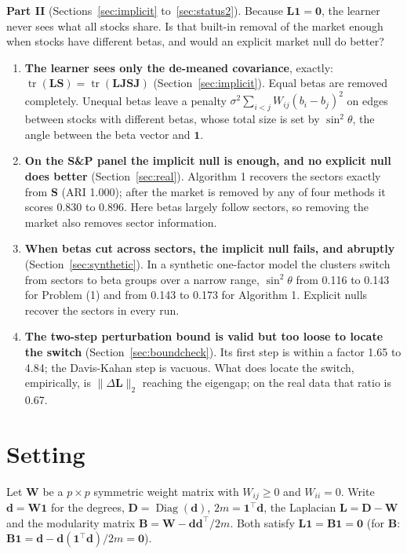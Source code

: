 \documentclass[11pt,a4paper]{article}
\newcommand{\Lap}{\mathbf{L}}
\newcommand{\Wmat}{\mathbf{W}}
\newcommand{\Bmat}{\mathbf{B}}
\newcommand{\Dmat}{\mathbf{D}}
\newcommand{\Smat}{\mathbf{S}}
\newcommand{\dvec}{\mathbf{d}}
\newcommand{\one}{\mathbf{1}}
\newcommand{\tr}{\operatorname{tr}}
\theoremstyle{remark}
\begin{document}
\textbf{Part II} (Sections~\ref{sec:implicit} to~\ref{sec:status2}). Because
$\Lap\one=\mathbf 0$, the learner never sees what all stocks share. Is that built-in
removal of the market enough when stocks have different betas, and would an explicit
market null do better?
\begin{enumerate}[resume]
\item \textbf{The learner sees only the de-meaned covariance}, exactly:
  $\tr(\Lap\Smat)=\tr(\Lap\mathbf J\Smat\mathbf J)$ (Section~\ref{sec:implicit}). Equal
  betas are removed completely. Unequal betas leave a penalty
  $\sigma^2\sum_{i<j}W_{ij}(b_i-b_j)^2$ on edges between stocks with different betas,
  whose total size is set by $\sin^2\theta$, the angle between the beta vector and $\one$.
\item \textbf{On the S\&P panel the implicit null is enough, and no explicit null does
  better} (Section~\ref{sec:real}). Algorithm 1 recovers the sectors exactly from
  $\Smat$ (ARI 1.000); after the market is removed by any of four methods it scores
  0.830 to 0.896. Here betas largely follow sectors, so removing the market also removes
  sector information.
\item \textbf{When betas cut across sectors, the implicit null fails, and abruptly}
  (Section~\ref{sec:synthetic}). In a synthetic one-factor model the clusters switch
  from sectors to beta groups over a narrow range, $\sin^2\theta$ from 0.116 to 0.143
  for Problem (1) and from 0.143 to 0.173 for Algorithm 1. Explicit nulls recover the sectors in every run.
\item \textbf{The two-step perturbation bound is valid but too loose to locate the
  switch} (Section~\ref{sec:boundcheck}). Its first step is within a factor 1.65 to 4.84;
  the Davis-Kahan step is vacuous. What does locate the switch, empirically, is
  $\lVert\Delta\Lap\rVert_2$ reaching the eigengap; on the real data that ratio is 0.67.
\end{enumerate}

\section{Setting}

Let $\Wmat$ be a $p\times p$ symmetric weight matrix with $W_{ij}\ge0$ and $W_{ii}=0$.
Write $\dvec=\Wmat\one$ for the degrees, $\Dmat=\operatorname{Diag}(\dvec)$,
$2m=\one^\top\dvec$, the Laplacian $\Lap=\Dmat-\Wmat$ and the modularity matrix
$\Bmat=\Wmat-\dvec\dvec^\top/2m$. Both satisfy $\Lap\one=\Bmat\one=\mathbf 0$ (for
$\Bmat$: $\Bmat\one=\dvec-\dvec(\one^\top\dvec)/2m=\mathbf 0$).
\end{document}
